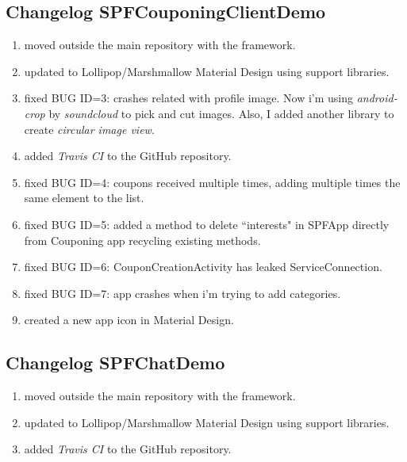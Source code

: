 \subsection*{Changelog SPFCouponingClientDemo}
\begin{enumerate}
	\item moved outside the main repository with the framework.
	\item updated to Lollipop/Marshmallow Material Design using support libraries.
	\item fixed BUG ID=3: crashes related with profile image. Now i'm using \emph{android-crop} by \emph{soundcloud} to pick and cut images. Also, I added another library to create \emph{circular image view}.	
	\item added \emph{Travis CI} to the GitHub repository.
	\item fixed BUG ID=4: coupons received multiple times, adding multiple times the same element to the list.
	\item fixed BUG ID=5: added a method to delete ``interests" in \textsf{SPFApp} directly from Couponing app recycling existing methods.
	\item fixed BUG ID=6: \textsf{CouponCreationActivity} has leaked \textsf{ServiceConnection}.
	\item fixed BUG ID=7: app crashes when i'm trying to add categories.
	\item created a new app icon in Material Design.
\end{enumerate}

\subsection*{Changelog SPFChatDemo}
\begin{enumerate}
	\item moved outside the main repository with the framework.
	\item updated to Lollipop/Marshmallow Material Design using support libraries.	
	\item added \emph{Travis CI} to the GitHub repository.
\end{enumerate}
